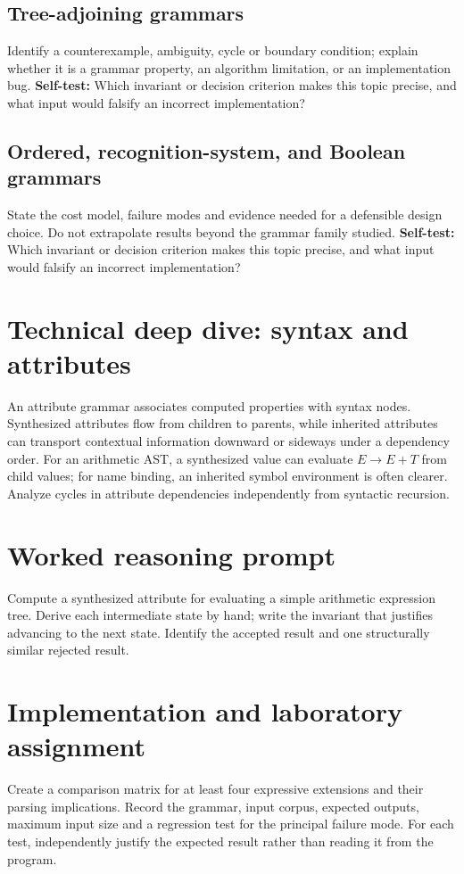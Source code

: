 \documentclass[11pt,letterpaper]{article}
\begin{document}
\subsection{Tree-adjoining grammars}
Identify a counterexample, ambiguity, cycle or boundary condition; explain whether it is a grammar property, an algorithm limitation, or an implementation bug.
\textbf{Self-test:} Which invariant or decision criterion makes this topic precise, and what input would falsify an incorrect implementation?
\subsection{Ordered, recognition-system, and Boolean grammars}
State the cost model, failure modes and evidence needed for a defensible design choice. Do not extrapolate results beyond the grammar family studied.
\textbf{Self-test:} Which invariant or decision criterion makes this topic precise, and what input would falsify an incorrect implementation?
\section{Technical deep dive: syntax and attributes}
An attribute grammar associates computed properties with syntax nodes. Synthesized attributes flow from children to parents, while inherited attributes can transport contextual information downward or sideways under a dependency order. For an arithmetic AST, a synthesized value can evaluate $E\to E+T$ from child values; for name binding, an inherited symbol environment is often clearer. Analyze cycles in attribute dependencies independently from syntactic recursion.
\section{Worked reasoning prompt}
Compute a synthesized attribute for evaluating a simple arithmetic expression tree. Derive each intermediate state by hand; write the invariant that justifies advancing to the next state. Identify the accepted result and one structurally similar rejected result.
\section{Implementation and laboratory assignment}
Create a comparison matrix for at least four expressive extensions and their parsing implications. Record the grammar, input corpus, expected outputs, maximum input size and a regression test for the principal failure mode. For each test, independently justify the expected result rather than reading it from the program.
\end{document}
